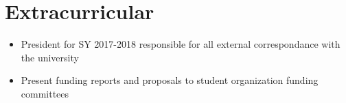 \documentclass{resume}
\begin{document}
\section{%
Extracurricular}
\begin{itemize}[noitemsep,nolistsep]
  \item President for SY 2017-2018 responsible for all external correspondance with the university
  \item Present funding reports and proposals to student organization funding committees
\end{itemize}




%
%
\end{document}
